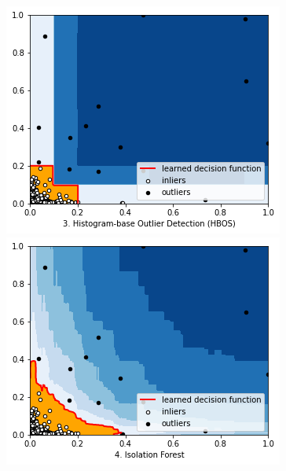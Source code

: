 \documentclass[12pt,twoside]{report}
\begin{document}
\begin{figure}[H]
\begin{multicols}{2}
    \includegraphics[width=\linewidth]{../code/figures/hbos.png}\par 
    \includegraphics[width=\linewidth]{../code/figures/if.png}\par 
\end{multicols}
\label{fig:hbos-if}
\end{figure}
\end{document}
